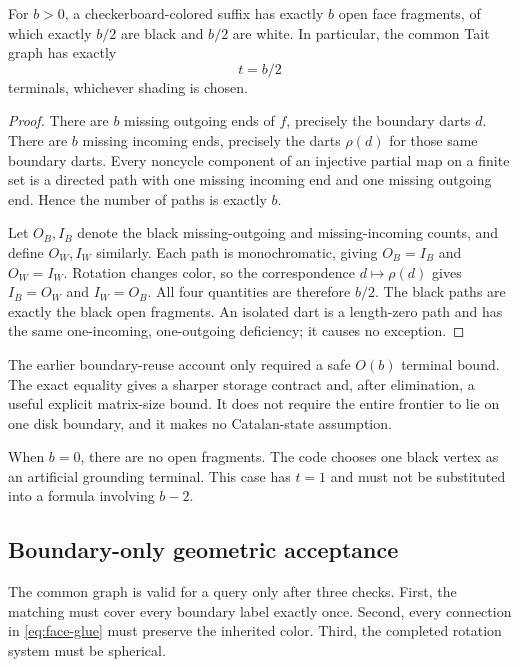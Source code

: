 \begin{theorem}
\label{thm:half-boundary}
For $b>0$, a checkerboard-colored suffix has exactly $b$ open face fragments,
of which exactly $b/2$ are black and $b/2$ are white. In particular, the common
Tait graph has exactly
\[
                              t=b/2
\]
terminals, whichever shading is chosen.
\end{theorem}
\begin{proof}
There are $b$ missing outgoing ends of $f$, precisely the boundary darts $d$.
There are $b$ missing incoming ends, precisely the darts $\rho(d)$ for those
same boundary darts. Every noncycle component of an injective partial map on
a finite set is a directed path with one missing incoming end and one missing
outgoing end. Hence the number of paths is exactly $b$.

Let $O_B,I_B$ denote the black missing-outgoing and missing-incoming counts,
and define $O_W,I_W$ similarly. Each path is monochromatic, giving
$O_B=I_B$ and $O_W=I_W$. Rotation changes color, so the correspondence
$d\mapsto\rho(d)$ gives $I_B=O_W$ and $I_W=O_B$. All four quantities are
therefore $b/2$. The black paths are exactly the black open fragments.
An isolated dart is a length-zero path and has the same one-incoming,
one-outgoing deficiency; it causes no exception.
\end{proof}

The earlier boundary-reuse account only required a safe $O(b)$ terminal bound.
The exact equality gives a sharper storage contract and, after elimination,
a useful explicit matrix-size bound. It does not require the entire frontier
to lie on one disk boundary, and it makes no Catalan-state assumption.

When $b=0$, there are no open fragments. The code chooses one black vertex
as an artificial grounding terminal. This case has $t=1$ and must not be
substituted into a formula involving $b-2$.

\subsection{Boundary-only geometric acceptance}

The common graph is valid for a query only after three checks.
First, the matching must cover every boundary label exactly once.
Second, every connection in \cref{eq:face-glue} must preserve the inherited
color. Third, the completed rotation system must be spherical.

